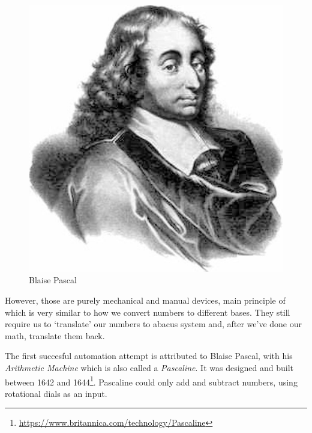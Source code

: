 \documentclass{article}
\begin{document}
            \begin{figure}
                \centering
                \includegraphics[scale=0.1]{images/persons/person_blaise_pascal.jpg}
                \caption{Blaise Pascal}
            \end{figure}

            However, those are purely mechanical and manual devices, main principle of which is very similar to how we convert numbers to different bases. They still
            require us to `translate' our numbers to abacus system and, after we've done our math, translate them back. \par
            
            The first succesful automation attempt is attributed to Blaise Pascal, with his \emph{Arithmetic Machine} which is also called a \emph{Pascaline}.
            It was designed and built between 1642 and 1644\footnote{\href{https://www.britannica.com/technology/Pascaline}{https://www.britannica.com/technology/Pascaline}}. 
            Pascaline could only add and subtract numbers, using rotational dials as an input.\par
\end{document}
